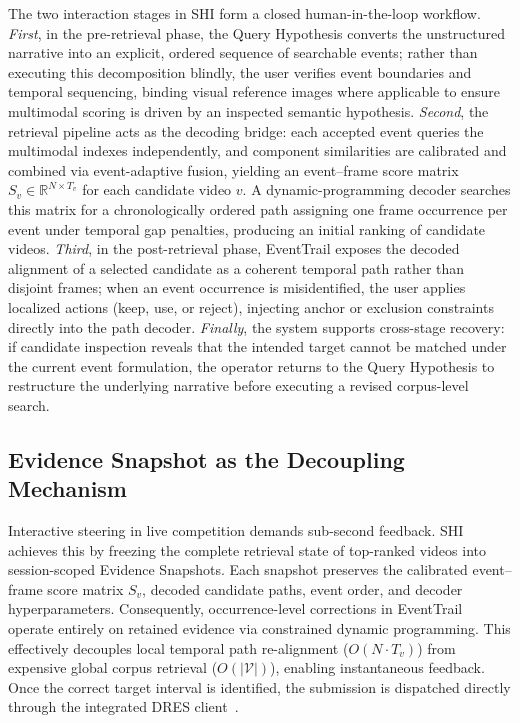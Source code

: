 The two interaction stages in SHI form a closed human-in-the-loop workflow.
\emph{First}, in the pre-retrieval phase, the Query Hypothesis converts the
unstructured narrative into an explicit, ordered sequence of searchable events;
rather than executing this decomposition blindly, the user verifies event
boundaries and temporal sequencing, binding visual reference images where
applicable to ensure multimodal scoring is driven by an inspected semantic
hypothesis.
\emph{Second}, the retrieval pipeline acts as the decoding bridge: each accepted
event queries the multimodal indexes independently, and component similarities
are calibrated and combined via event-adaptive fusion, yielding an event--frame
score matrix $S_v \in \mathbb{R}^{N \times T_v}$ for each candidate video $v$. A
dynamic-programming decoder searches this matrix for a chronologically ordered
path assigning one frame occurrence per event under temporal gap penalties,
producing an initial ranking of candidate videos.
\emph{Third}, in the post-retrieval phase, EventTrail exposes the decoded alignment of
a selected candidate as a coherent temporal path rather than disjoint frames;
when an event occurrence is misidentified, the user applies localized actions
(keep, use, or reject), injecting anchor or exclusion constraints directly into
the path decoder.
\emph{Finally}, the system supports cross-stage recovery: if candidate inspection
reveals that the intended target cannot be matched under the current event
formulation, the operator returns to the Query Hypothesis to restructure the
underlying narrative before executing a revised corpus-level search.

\subsection{Evidence Snapshot as the Decoupling Mechanism}
\label{sec:evidence-snapshots}

Interactive steering in live competition demands sub-second feedback. SHI
achieves this by freezing the complete retrieval state of top-ranked videos
into session-scoped Evidence Snapshots. Each snapshot preserves the calibrated
event--frame score matrix $S_v$, decoded candidate paths, event order, and
decoder hyperparameters. Consequently, occurrence-level corrections in EventTrail
operate entirely on retained evidence via constrained dynamic programming. This
effectively decouples local temporal path re-alignment ($O(N \cdot T_v)$) from
expensive global corpus retrieval ($O(|\mathcal{V}|)$), enabling instantaneous
feedback. Once the correct target interval is identified, the submission is
dispatched directly through the integrated DRES client~\cite{rossetto2021dres}.